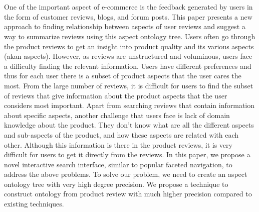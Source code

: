 \part{}One of the important aspect of e-commerce is the feedback generated by users in the form of customer reviews, blogs, and forum posts. This paper presents a new approach to finding relationship between aspects of user reviews and suggest a way to summarize reviews using this aspect ontology tree. Users often go through the product reviews to get an insight into product quality and its various aspects (akan aspects). However, as reviews are unstructured and voluminous, users face a difficulty finding the relevant information. Users have different preferences and thus for each user there is a subset of product aspects that the user cares the most. From the large number of reviews, it is difficult for users to find the subset of reviews that give information about the product aspects that the user considers most important. Apart from searching reviews that contain information about specific aspects, another challenge that users face is lack of domain knowledge about the product. They don’t know what are all the different aspects and sub-aspects of the product, and how these aspects are related with each other. Although this information is there in the product reviews, it is very difficult for users to get it directly from the reviews. In this paper, we propose a novel interactive search interface, similar to popular faceted navigation, to address the above problems. To solve our problem, we need to create an aspect ontology tree with very high degree precision. We propose a technique to construct ontology from product review with much  higher precision compared to existing techniques.
